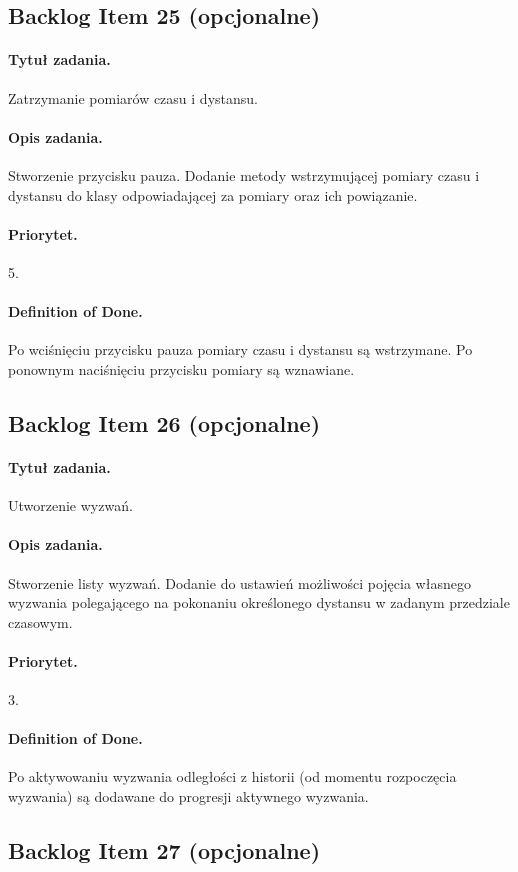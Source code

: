 \documentclass[a4paper]{article}
\begin{document}
\subsection{Backlog Item 25 (opcjonalne)}
\paragraph{Tytuł zadania.} Zatrzymanie pomiarów czasu i dystansu.
\paragraph{Opis zadania.} Stworzenie przycisku pauza. Dodanie metody wstrzymującej pomiary czasu i dystansu do klasy odpowiadającej za pomiary oraz ich powiązanie.
\paragraph{Priorytet.} 5.
\paragraph{Definition of Done.} Po wciśnięciu przycisku pauza pomiary czasu i dystansu są wstrzymane. Po ponownym naciśnięciu przycisku pomiary są wznawiane.

\subsection{Backlog Item 26 (opcjonalne)}
\paragraph{Tytuł zadania.} Utworzenie wyzwań.
\paragraph{Opis zadania.} Stworzenie listy wyzwań. Dodanie do ustawień możliwości pojęcia własnego wyzwania polegającego na pokonaniu określonego dystansu w zadanym przedziale czasowym.
\paragraph{Priorytet.} 3.
\paragraph{Definition of Done.} Po aktywowaniu wyzwania odległości z historii (od momentu rozpoczęcia wyzwania) są dodawane do progresji aktywnego wyzwania.

\subsection{Backlog Item 27 (opcjonalne)}
\end{document}

